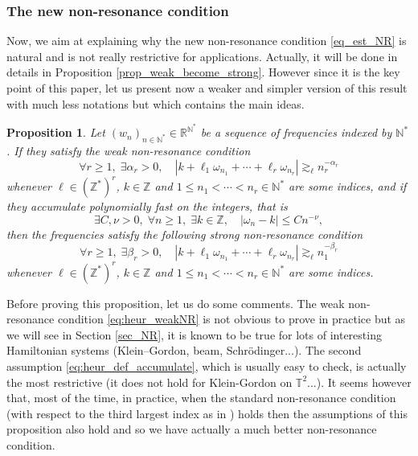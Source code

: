 \documentclass[JEP,XML,SOM,Unicode,NoEqCountersInSection,published]{cedram}
\newtheorem{proposition}[theorem]{Proposition}
\theoremstyle{definition}
\begin{document}
\subsubsection*{The new non-resonance condition}
Now, we aim at explaining why the new non-resonance condition \eqref{eq_est_NR} is natural and is not really restrictive for applications. Actually, it will be done in details in Proposition \ref{prop_weak_become_strong}. However since it is the key point of this paper, let us present now a weaker and simpler version of this result with much less notations but which contains the main ideas.
\begin{proposition} \label{prop:heur_SD} Let $(w_n)_{n\in \mathbb{N}^*} \in \mathbb{R}^{\mathbb{N}^*}$ be a sequence of frequencies indexed by $\mathbb{N}^*$. If they satisfy the weak non-resonance condition
\begin{equation}
\label{eq:heur_weakNR}
\forall r\geq 1,\; \exists \alpha_r >0, \quad |k+\ell_1 \omega_{n_1} + \cdots + \ell_r \omega_{n_r}| \gtrsim_\ell n_r^{-\alpha_r}
\end{equation}
whenever $\ell \in (\mathbb{Z}^*)^r$, $k \in \mathbb{Z}$ and $1\leq n_1< \cdots < n_r \in \mathbb{N}^*$ are some indices, and if they accumulate polynomially fast on the integers, that is
\begin{equation}
\label{eq:heur_def_accumulate}
\exists C,\nu >0,\;\forall n \geq 1,\; \exists k \in \mathbb{Z}, \quad |\omega_n - k | \leq C n^{-\nu},
\end{equation}
then the frequencies satisfy the following strong non-resonance condition
\begin{equation}
\label{eq:heur_strongNR}
\forall r\geq 1,\; \exists \beta_r >0, \quad |k+\ell_1 \omega_{n_1} + \cdots + \ell_r \omega_{n_r}| \gtrsim_\ell n_1^{-\beta_r}
\end{equation}
whenever $\ell \in (\mathbb{Z}^*)^r$, $k \in \mathbb{Z}$ and $1\leq n_1< \cdots < n_r \in \mathbb{N}^*$ are some indices.
\end{proposition}
Before proving this proposition, let us do some comments. The weak non-resonance condition \eqref{eq:heur_weakNR} is not obvious to prove in practice but as we will see in Section \ref{sec_NR}, it is known to be true for lots of interesting Hamiltonian systems (Klein--Gordon, beam, Schrödinger...). The second assumption \eqref{eq:heur_def_accumulate}, which is usually easy to check, is actually the most restrictive (\eg it does not hold for Klein-Gordon on $\mathbb{T}^2$...). It seems however that, most of the time, in practice, when the standard non-resonance condition (\ie with respect to the third largest index as in \cite{Bam03}) holds then the assumptions of this proposition also hold and so we have actually a much better non-resonance condition.
\end{document}
